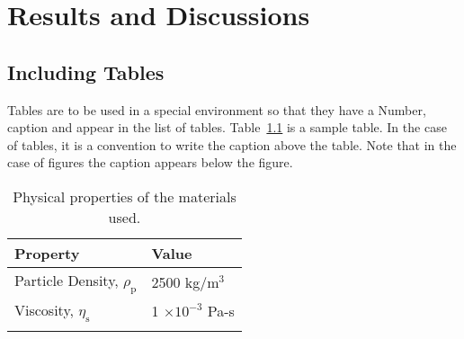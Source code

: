 \chapter{Results and Discussions}


\section{Including Tables}

Tables are to be used in a special environment so that they have a
Number, caption and appear in the list of tables.
Table~\ref{tab:samtab} is a sample table. In the case of tables, it is
a convention to write the caption above the table.  Note that in the
case of figures the caption appears below the figure.

\begin{table}[tbp]
  \centering
    \caption{Physical properties of the materials used.}
    \label{tab:samtab}
    \begin{tabular}{ll}
      \toprule 
      Property & Value \\
      \midrule
      Particle Density, $\rho_{\mathrm{p}}$ & 2500 kg/m$^{3}$ \\
      Viscosity, $\eta_{\mathrm{s}}$& 1 $\times 10^{-3}$ Pa-s \\
      \bottomrule \\
    \end{tabular}  
\end{table}

